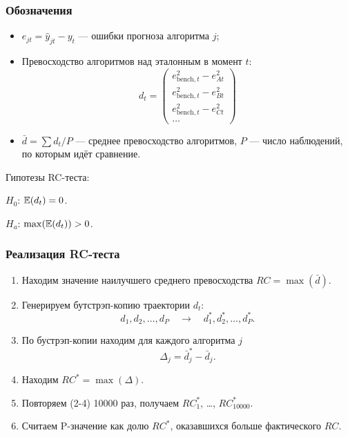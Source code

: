 \begin{frame}
    \frametitle{Обозначения}
    
    \begin{itemize}
        \item $e_{jt} = \hat y_{jt} - y_t$ — ошибки прогноза алгоритма $j$; \pause
        \item Превосходство алгоритмов над эталонным в момент $t$:
        \[
        d_t = \begin{pmatrix}
          e_{\text{bench}, t}^2 - e_{At}^2 \\
          e_{\text{bench}, t}^2 - e_{Bt}^2 \\          
          e_{\text{bench}, t}^2 - e_{Ct}^2 \\
          \ldots
        \end{pmatrix}  
        \] \pause
        \item $\bar d = \sum d_t / P$ —  среднее превосходство алгоритмов, $P$ — число наблюдений, по которым идёт сравнение.  
    \end{itemize}    
    \pause 
    Гипотезы RC-теста:
    
    $H_0$: $\mathbb{E}(d_t) = 0$. 

    $H_a$: $\max(\mathbb{E}(d_t)) > 0$.
\end{frame}




\begin{frame}
    \frametitle{Реализация RC-теста}

    \begin{enumerate}[<+->]
        \item Находим значение наилучшего среднего превосходства $RC = \max (\bar d)$.  
        \item Генерируем \alert{бутстрэп-копию} траектории $d_t$: 
        \[
        d_1, d_2, \ldots, d_P  \quad \to \quad     d_1^*, d_2^*, \ldots, d_P^*.
        \]
        \item По бустрэп-копии находим для каждого алгоритма $j$
        \[
            \Delta_j = \bar d^*_j - \bar d_j.
        \]
        \item Находим $RC^* = \max(\Delta)$.
        \item Повторяем (2-4) 10000 раз, получаем $RC^*_1$, \ldots, $RC^*_{10000}$.
        \item Считаем P-значение как долю $RC^*$, оказавшихся больше фактического $RC$.
    \end{enumerate}
\end{frame}


